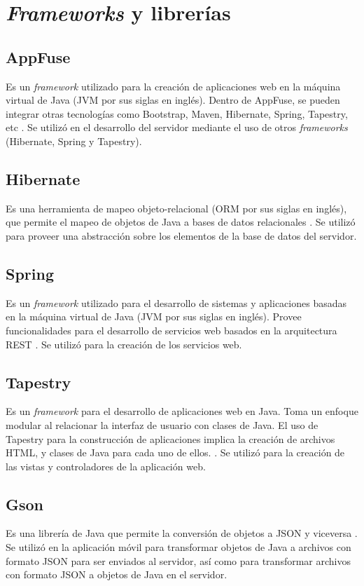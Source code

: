 \section{\textit{Frameworks} y librerías} \label{Frameworks y librerias}

\subsection{AppFuse}
Es un \textit{framework} utilizado para la creación de aplicaciones web en la máquina virtual de Java (JVM por sus siglas en inglés). Dentro de AppFuse, se pueden integrar otras tecnologías como Bootstrap, Maven, Hibernate, Spring, Tapestry, etc \cite{APF1}. Se utilizó en el desarrollo del servidor mediante el uso de otros \textit{frameworks} (Hibernate, Spring y Tapestry).

\subsection{Hibernate}
Es una herramienta de mapeo objeto-relacional (ORM por sus siglas en inglés), que permite el mapeo de objetos de Java a bases de datos relacionales \cite{HBR1}. Se utilizó para proveer una abstracción sobre los elementos de la base de datos del servidor.

\subsection{Spring}
Es un \textit{framework} utilizado para el desarrollo de sistemas y aplicaciones basadas en la máquina virtual de Java (JVM por sus siglas en inglés). Provee funcionalidades para el desarrollo de servicios web basados en la arquitectura REST \cite{SPRNG0}. Se utilizó para la creación de los servicios web.

\subsection{Tapestry}
Es un \textit{framework} para el desarrollo de aplicaciones web en Java. Toma un enfoque modular al relacionar la interfaz de usuario con clases de Java. El uso de Tapestry para la construcción de aplicaciones implica la creación de archivos HTML, y clases de Java para cada uno de ellos. \cite{ATP1}. Se utilizó para la creación de las vistas y controladores de la aplicación web.

\subsection{Gson}
Es una librería de Java que permite la conversión de objetos a JSON y viceversa \cite{GSN1}. Se utilizó en la aplicación móvil para transformar objetos de Java a archivos con formato JSON para ser enviados al servidor, así como para transformar archivos con formato JSON a objetos de Java en el servidor.

